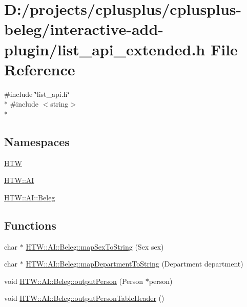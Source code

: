 \hypertarget{interactive-add-plugin_2list__api__extended_8h}{\section{D\-:/projects/cplusplus/cplusplus-\/beleg/interactive-\/add-\/plugin/list\-\_\-api\-\_\-extended.h File Reference}
\label{interactive-add-plugin_2list__api__extended_8h}
}
{\ttfamily \#include \char`\"{}list\-\_\-api.\-h\char`\"{}}\\*
{\ttfamily \#include $<$string$>$}\\*
\subsection*{Namespaces}
\begin{DoxyCompactItemize}
\item 
\hyperlink{namespace_h_t_w}{H\-T\-W}
\item 
\hyperlink{namespace_h_t_w_1_1_a_i}{H\-T\-W\-::\-A\-I}
\item 
\hyperlink{namespace_h_t_w_1_1_a_i_1_1_beleg}{H\-T\-W\-::\-A\-I\-::\-Beleg}
\end{DoxyCompactItemize}
\subsection*{Functions}
\begin{DoxyCompactItemize}
\item 
char $\ast$ \hyperlink{namespace_h_t_w_1_1_a_i_1_1_beleg_aa88237c539d44af6b297104e90f3fe4a}{H\-T\-W\-::\-A\-I\-::\-Beleg\-::map\-Sex\-To\-String} (Sex sex)
\item 
char $\ast$ \hyperlink{namespace_h_t_w_1_1_a_i_1_1_beleg_a71374c8885c328cc86695031048d6f3a}{H\-T\-W\-::\-A\-I\-::\-Beleg\-::map\-Department\-To\-String} (Department department)
\item 
void \hyperlink{namespace_h_t_w_1_1_a_i_1_1_beleg_a0079743a47110e2ebbf1d1c0adc88a4f}{H\-T\-W\-::\-A\-I\-::\-Beleg\-::output\-Person} (Person $\ast$person)
\item 
void \hyperlink{namespace_h_t_w_1_1_a_i_1_1_beleg_a4a69303afeacbd64a2185c148f7b1862}{H\-T\-W\-::\-A\-I\-::\-Beleg\-::output\-Person\-Table\-Header} ()
\end{DoxyCompactItemize}
